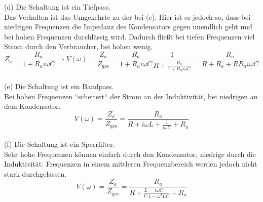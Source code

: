 \documentclass[11pt a4paper]{article}
\begin{document}
(d) Die Schaltung ist ein Tiefpass. \\
Das Verhalten ist das Umgekehrte zu der bei (c). Hier ist es jedoch so, dass bei niedrigen Frequenzen die Impedanz
des Kondensators gegen unendlich geht und bei hohen Frequenzen durchlässig wird. Dadurch fließt bei tiefen
Frequenzen viel Strom durch den Verbraucher, bei hohen wenig.
\[
	Z_a = \frac{R_a}{1 + R_a i\omega C}
	\Rightarrow 
	V(\omega) = \frac{Z_a}{Z_\text{ges}} 
	= \frac{R_a}{1 + R_a i\omega C} \frac{1}{R + \frac{R_a}{1 + R_a i\omega C}}
	= \frac{R_a}{R + R_a + RR_a i\omega C}
\]
\\

(e) Die Schaltung ist ein Bandpass. \\
Bei hohen Frequenzen ``scheitert`` der Strom an der Induktivität, bei niedrigen an dem Kondensator.
\[
	V(\omega) = \frac{Z_a}{Z_\text{ges}} = \frac{R_a}{R + i\omega L + \frac{1}{i \omega C} + R_a}
\]
\\

(f) Die Schaltung ist ein Sperrfilter. \\
Sehr hohe Frequenzen können einfach durch den Kondensator, niedrige durch die Induktivität. Frequenzen in einem
mittleren Frequenzbereich werden jedoch nicht stark durchgelassen.
\[
	V(\omega) = \frac{Z_a}{Z_\text{ges}} 
	= \frac{R_a}{R + \frac{L}{C} \frac{i\omega C}{1 - \omega^2 LC} + R_a}
\]
\end{document}
